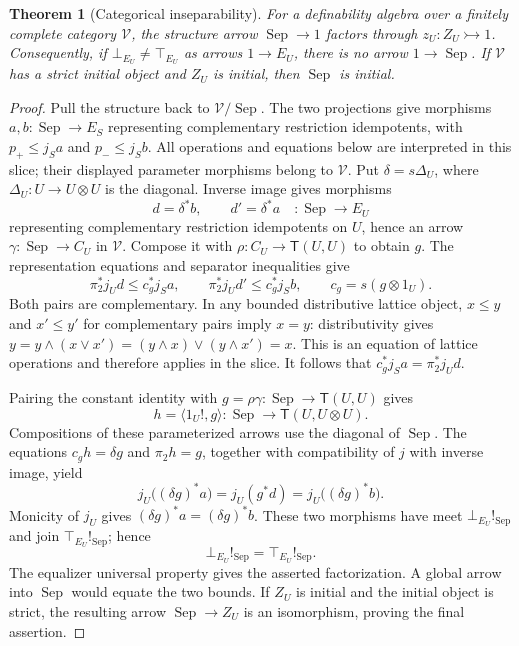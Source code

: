 \documentclass[11pt]{article}
\newtheorem{theorem}{Theorem}[section]
\theoremstyle{definition}
\theoremstyle{remark}
\begin{document}
\begin{theorem}[Categorical inseparability]
\label{thm:internal-inseparability}
For a definability algebra over a finitely complete category
$\mathscr V$, the structure arrow $\operatorname{Sep}\to1$
factors through $z_U:Z_U\rightarrowtail1$.
Consequently, if $\bot_{E_U}\ne\top_{E_U}$ as arrows $1\to E_U$,
there is no arrow $1\to\operatorname{Sep}$.
If $\mathscr V$ has a strict initial object and $Z_U$ is initial,
then $\operatorname{Sep}$ is initial.
\end{theorem}
\begin{proof}
Pull the structure back to $\mathscr V/\operatorname{Sep}$.
The two projections give morphisms
$a,b:\operatorname{Sep}\to E_S$ representing complementary restriction idempotents,
with $p_+\leq j_Sa$ and $p_-\leq j_Sb$.
All operations and equations below are interpreted in this slice;
their displayed parameter morphisms belong to $\mathscr V$.
Put $\delta=s\Delta_U$, where
$\Delta_U:U\to U\otimes U$ is the diagonal. Inverse image gives morphisms
\[
 d=\delta^*b,\qquad d'=\delta^*a
 \quad:\operatorname{Sep}\longrightarrow E_U
\]
representing complementary restriction idempotents on $U$, hence an arrow $\gamma:\operatorname{Sep}\to C_U$ in
$\mathscr V$. Compose it with $\rho:C_U\to \mathsf T(U,U)$ to obtain $g$.
The representation equations and separator inequalities give
\[
 \pi_2^*j_Ud\leq c_g^*j_Sa,
 \qquad
 \pi_2^*j_Ud'\leq c_g^*j_Sb,
 \qquad c_g=s(g\otimes1_U).
\]
Both pairs are complementary. In any bounded distributive
lattice object, $x\leq y$ and $x'\leq y'$ for complementary
pairs imply $x=y$: distributivity gives
$y=y\wedge(x\vee x')=(y\wedge x)\vee(y\wedge x')=x$.
This is an equation of lattice operations and therefore applies
in the slice. It follows that
$c_g^*j_Sa=\pi_2^*j_Ud$.

Pairing the constant identity with
$g=\rho\gamma:\operatorname{Sep}\to\mathsf T(U,U)$ gives
\[
 h=\langle1_U!,g\rangle:
 \operatorname{Sep}\longrightarrow\mathsf T(U,U\otimes U).
\]
Compositions of these parameterized arrows use the diagonal of
$\operatorname{Sep}$. The equations
$c_gh=\delta g$ and $\pi_2h=g$, together with compatibility of
$j$ with inverse image, yield
\[
 j_U\bigl((\delta g)^*a\bigr)
   =j_U(g^*d)
   =j_U\bigl((\delta g)^*b\bigr).
\]
Monicity of $j_U$ gives $(\delta g)^*a=(\delta g)^*b$.
These two morphisms have meet $\bot_{E_U}!_{\operatorname{Sep}}$
and join $\top_{E_U}!_{\operatorname{Sep}}$; hence
\[
 \bot_{E_U}!_{\operatorname{Sep}}
     =\top_{E_U}!_{\operatorname{Sep}}.
\]
The equalizer universal property gives the asserted factorization.
A global arrow into $\operatorname{Sep}$ would equate the two
bounds. If $Z_U$ is initial and the initial object is strict,
the resulting arrow $\operatorname{Sep}\to Z_U$ is an
isomorphism, proving the final assertion.
\end{proof}
\end{document}
